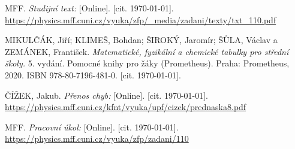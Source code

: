 
\begin{thebibliography}{9}
 MFF. \emph{Studijní text:} [Online]. [cit. \today]. \newline \url{https://physics.mff.cuni.cz/vyuka/zfp/_media/zadani/texty/txt_110.pdf}

 MIKULČÁK, Jiří; KLIMEŠ, Bohdan; ŠIROKÝ, Jaromír; ŠŮLA, Václav a ZEMÁNEK, František. \emph{Matematické, fyzikální a chemické tabulky pro střední školy.} 5. vydání. Pomocné knihy pro žáky (Prometheus). Praha: Prometheus, 2020. ISBN 978-80-7196-481-0. [cit. \today].

 ČÍŽEK, Jakub. \emph{Přenos chyb:} [Online]. [cit. \today]. \newline \url{https://physics.mff.cuni.cz/kfnt/vyuka/upf/cizek/prednaska8.pdf}

 MFF. \emph{Pracovní úkol:} [Online]. [cit. \today]. \newline \url{https://physics.mff.cuni.cz/vyuka/zfp/zadani/110}

\end{thebibliography}
